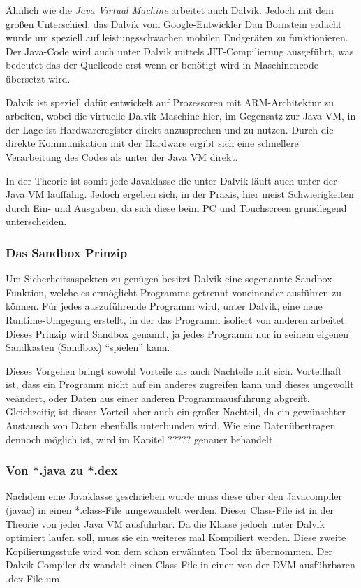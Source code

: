 \"Ahnlich wie die \emph{Java Virtual Machine} arbeitet auch Dalvik. Jedoch mit dem gro\ss{}en Unterschied, das Dalvik vom Google-Entwickler Dan Bornstein erdacht wurde um speziell auf leistungsschwachen mobilen Endger\"aten zu funktionieren. Der Java-Code wird auch unter Dalvik mittels \ac{JIT}-Compilierung ausgef\"uhrt, was bedeutet das der Quellcode erst wenn er ben\"otigt wird in Maschinencode \"ubersetzt wird.

Dalvik ist speziell daf\"ur entwickelt auf Prozessoren mit ARM-Architektur zu arbeiten, wobei die virtuelle Dalvik Maschine hier, im Gegensatz zur Java VM, in der Lage ist Hardwareregister direkt anzusprechen und zu nutzen. Durch die direkte Kommunikation mit der Hardware ergibt sich eine schnellere Verarbeitung des Codes als unter der Java VM direkt.

In der Theorie ist somit jede Javaklasse die unter Dalvik l\"auft auch unter der Java VM lauff\"ahig. Jedoch ergeben sich, in der Praxis, hier meist Schwierigkeiten durch Ein- und Ausgaben, da sich diese beim PC und Touchscreen grundlegend unterscheiden.

\subsubsection{Das Sandbox Prinzip}
Um Sicherheitsaspekten zu gen\"ugen besitzt Dalvik eine sogenannte Sandbox-Funktion, welche es erm\"oglicht Programme getrennt voneinander ausf\"uhren zu k\"onnen. F\"ur jedes auszuf\"uhrende Programm wird, unter Dalvik, eine neue Runtime-Umgegung erstellt, in der das Programm isoliert von anderen arbeitet. 
Dieses Prinzip wird Sandbox genannt, ja jedes Programm nur in seinem eigenen Sandkasten (Sandbox) "`spielen"' kann.

Dieses Vorgehen bringt sowohl Vorteile als auch Nachteile mit sich. Vorteilhaft ist, dass ein Programm nicht auf ein anderes zugreifen kann und dieses ungewollt ve\"andert, oder Daten aus einer anderen Programmausf\"uhrung abgreift. Gleichzeitig ist dieser Vorteil aber auch ein gro\ss{}er Nachteil, da ein gew\"unschter Austausch von Daten ebenfalls unterbunden wird.
Wie eine Daten\"ubertragen dennoch m\"oglich ist, wird im Kapitel ????? genauer behandelt.

\subsubsection{Von *.java zu *.dex}
Nachdem eine Javaklasse geschrieben wurde muss diese \"uber den Javacompiler (javac) in einen *.class-File umgewandelt werden. Dieser Class-File ist in der Theorie von jeder Java VM ausf\"uhrbar. Da die Klasse jedoch unter Dalvik optimiert laufen soll, muss sie ein weiteres mal Kompiliert werden. Diese zweite Kopilierungsstufe wird von dem schon erw\"ahnten Tool dx \"ubernommen. 
Der Dalvik-Compiler dx wandelt einen Class-File in einen von der \ac{DVM} ausf\"uhrbaren .dex-File um.

